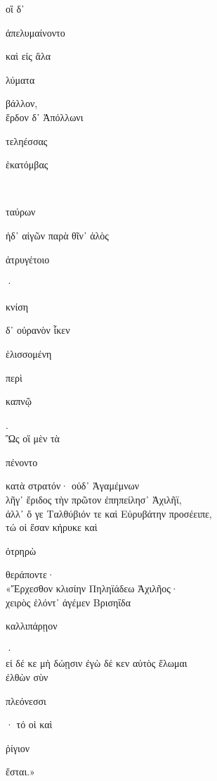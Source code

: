 \documentclass{ransom}
\begin{document}
\renewcommand{\rightheaderwhat}{\rightheaderwhatglosses}%
\begin{foreignpage}
\begin{graytext}
οἳ δ᾽ \begin{whitetext}ἀπελυμαίνοντο\end{whitetext} καὶ εἰς ἅλα \begin{whitetext}λύματα\end{whitetext} βάλλον,\\
ἕρδον δ᾽ Ἀπόλλωνι \begin{whitetext}τεληέσσας\end{whitetext} \begin{whitetext}ἑκατόμβας\end{whitetext}\hfill{}\\
\begin{whitetext}ταύρων\end{whitetext} ἠδ᾽ αἰγῶν παρὰ θῖν᾽ ἁλὸς \begin{whitetext}ἀτρυγέτοιο\end{whitetext}·\\
\begin{whitetext}κνίση\end{whitetext} δ᾽ οὐρανὸν ἷκεν \begin{whitetext}ἑλισσομένη\end{whitetext} περὶ \begin{whitetext}καπνῷ\end{whitetext}.\\
Ὣς οἳ μὲν τὰ \begin{whitetext}πένοντο\end{whitetext} κατὰ στρατόν· οὐδ᾽ Ἀγαμέμνων\\
λῆγ᾽ ἔριδος τὴν πρῶτον ἐπηπείλησ᾽ Ἀχιλῆϊ,\\
ἀλλ᾽ ὅ γε Ταλθύβιόν τε καὶ Εὐρυβάτην προσέειπε,\hfill{}\\
τώ οἱ ἔσαν κήρυκε καὶ \begin{whitetext}ὀτρηρὼ\end{whitetext} θεράποντε·\\
«Ἔρχεσθον κλισίην Πηληϊάδεω Ἀχιλῆος·\\
χειρὸς ἑλόντ᾽ ἀγέμεν Βρισηΐδα \begin{whitetext}καλλιπάρῃον\end{whitetext}·\\
εἰ δέ κε μὴ δώῃσιν ἐγὼ δέ κεν αὐτὸς ἕλωμαι\\
ἐλθὼν σὺν \begin{whitetext}πλεόνεσσι\end{whitetext}· τό οἱ καὶ \begin{whitetext}ῥίγιον\end{whitetext} ἔσται.»\hfill{}\\

\end{graytext}
\end{foreignpage}
\end{document}
